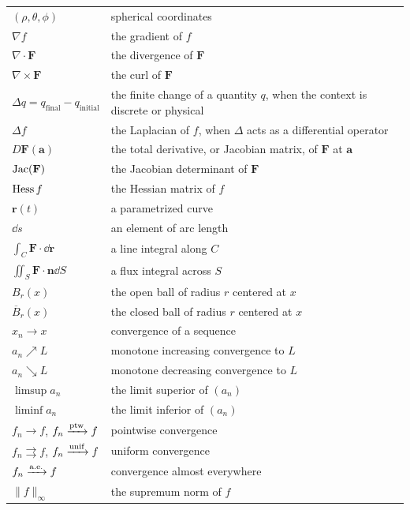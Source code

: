{\begin{longtable}{@{}L{0.27\textwidth}L{0.65\textwidth}@{}}
        $(\rho,\theta,\phi)$ & spherical coordinates \\
        $\nabla f$ & the gradient of $f$ \\
        $\nabla\cdot\mathbf{F}$ & the divergence of $\mathbf{F}$ \\
        $\nabla\times\mathbf{F}$ & the curl of $\mathbf{F}$ \\
        $\Delta q=q_{\mathrm{final}}-q_{\mathrm{initial}}$ & the finite change of a quantity $q$, when the context is discrete or physical \\
        $\Delta f$ & the Laplacian of $f$, when $\Delta$ acts as a differential operator \\
        $D\mathbf{F}(\mathbf{a})$ & the total derivative, or Jacobian matrix, of $\mathbf{F}$ at $\mathbf{a}$ \\
        $\operatorname{Jac}(\mathbf{F})$ & the Jacobian determinant of $\mathbf{F}$ \\
        $\operatorname{Hess} f$ & the Hessian matrix of $f$ \\
        $\mathbf{r}(t)$ & a parametrized curve \\
        $\dd s$ & an element of arc length \\
        $\displaystyle\int_C\mathbf{F}\cdot\dd\mathbf{r}$ & a line integral along $C$ \\
        $\displaystyle\iint_S\mathbf{F}\cdot\mathbf{n}\dd S$ & a flux integral across $S$ \\
        $B_r(x)$ & the open ball of radius $r$ centered at $x$ \\
        $\overline{B}_r(x)$ & the closed ball of radius $r$ centered at $x$ \\
        $x_n\to x$ & convergence of a sequence \\
        $a_n\nearrow L$ & monotone increasing convergence to $L$ \\
        $a_n\searrow L$ & monotone decreasing convergence to $L$ \\
        $\limsup a_n$ & the limit superior of $(a_n)$ \\
        $\liminf a_n$ & the limit inferior of $(a_n)$ \\
        $f_n\to f$, $f_n\xrightarrow{\mathrm{ptw}} f$ & pointwise convergence \\
        $f_n\rightrightarrows f$, $f_n\xrightarrow{\mathrm{unif}} f$ & uniform convergence \\
        $f_n\xrightarrow{\mathrm{a.e.}} f$ & convergence almost everywhere \\
        $\|f\|_\infty$ & the supremum norm of $f$ \\

\end{longtable}}
